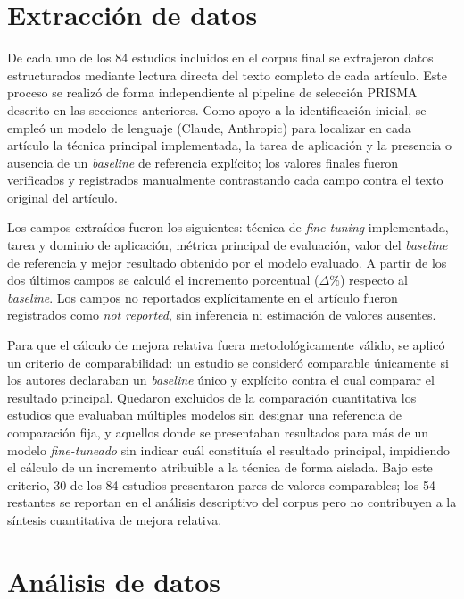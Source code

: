 \section{Extracción de datos}

De cada uno de los 84 estudios incluidos en el corpus final se extrajeron datos estructurados mediante lectura directa del texto completo de cada artículo. Este proceso se realizó de forma independiente al pipeline de selección PRISMA descrito en las secciones anteriores. Como apoyo a la identificación inicial, se empleó un modelo de lenguaje (Claude, Anthropic) para localizar en cada artículo la técnica principal implementada, la tarea de aplicación y la presencia o ausencia de un \textit{baseline} de referencia explícito; los valores finales fueron verificados y registrados manualmente contrastando cada campo contra el texto original del artículo.

Los campos extraídos fueron los siguientes: técnica de \textit{fine-tuning} implementada, tarea y dominio de aplicación, métrica principal de evaluación, valor del \textit{baseline} de referencia y mejor resultado obtenido por el modelo evaluado. A partir de los dos últimos campos se calculó el incremento porcentual ($\Delta$\%) respecto al \textit{baseline}. Los campos no reportados explícitamente en el artículo fueron registrados como \textit{not reported}, sin inferencia ni estimación de valores ausentes.

Para que el cálculo de mejora relativa fuera metodológicamente válido, se aplicó un criterio de comparabilidad: un estudio se consideró comparable únicamente si los autores declaraban un \textit{baseline} único y explícito contra el cual comparar el resultado principal. Quedaron excluidos de la comparación cuantitativa los estudios que evaluaban múltiples modelos sin designar una referencia de comparación fija, y aquellos donde se presentaban resultados para más de un modelo \textit{fine-tuneado} sin indicar cuál constituía el resultado principal, impidiendo el cálculo de un incremento atribuible a la técnica de forma aislada. Bajo este criterio, 30 de los 84 estudios presentaron pares de valores comparables; los 54 restantes se reportan en el análisis descriptivo del corpus pero no contribuyen a la síntesis cuantitativa de mejora relativa.

\section{Análisis de datos}

